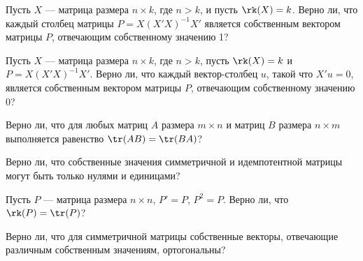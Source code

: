 \documentclass[pdftex,11pt,openany]{book}\usepackage[]{graphicx}\usepackage[]{color}
\begin{document}
\begin{solution}
\end{solution}


\begin{problem}
Пусть $X$ --- матрица размера ${n \times k}$, где $n > k$, и пусть $\rk(X) = k$. Верно ли, что каждый столбец матрицы $P = X(X'X)^{-1}X'$ является собственным вектором матрицы $P$, отвечающим собственному значению 1?
\end{problem}

\begin{solution}
\end{solution}


\begin{problem}
Пусть $X$ --- матрица размера ${n \times k}$, где $n > k$, пусть $\rk(X) = k$ и $P = X(X'X)^{-1}X'$. Верно ли, что каждый вектор-столбец $u$, такой что $X'u=0$, является собственным вектором матрицы $P$, отвечающим собственному значению 0?
\end{problem}

\begin{solution}
\end{solution}


\begin{problem}
  Верно ли, что для любых матриц $A$ размера $m\times n$ и матриц $B$ размера 
${n \times m}$ выполняется равенство $\tr(AB) = \tr(BA)$?
\end{problem}

\begin{solution}
\end{solution}

\begin{problem}
Верно ли, что собственные значения симметричной и идемпотентной матрицы могут быть только нулями и единицами?
\end{problem}

\begin{solution}
\end{solution}

\begin{problem}
Пусть $P$ --- матрица размера ${n \times n}$, $P'= P$, $P^2 = P$. Верно ли, что $\rk(P) = \tr(P)$?
\end{problem}

\begin{solution}
\end{solution}


\begin{problem}
  Верно ли, что для симметричной матрицы собственные векторы, отвечающие различным собственным значениям, ортогональны?
\end{problem}
\end{document}
